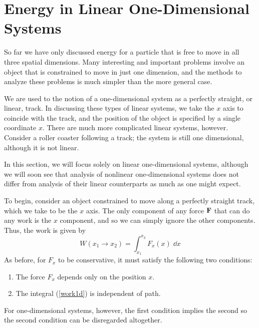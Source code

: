 \section{Energy in Linear One-Dimensional Systems}
So far we have only discussed energy for a particle that is free to move in all three spatial dimensions. Many interesting and important problems involve an object that is constrained to move in just one dimension, and the methods to analyze these problems is much simpler than the more general case. 

We are used to the notion of a one-dimensional system as a perfectly straight, or linear, track. In discussing these types of linear systems, we take the $x$ axis to coincide with the track, and the position of the object is specified by a single coordinate $x$. There are much more complicated linear systems, however. Consider a roller coaster following a track; the system is still one dimensional, although it is not linear.

In this section, we will focus solely on linear one-dimensional systems, although we will soon see that analysis of nonlinear one-dimensional systems does not differ from analysis of their linear counterparts as much as one might expect.

To begin, consider an object constrained to move along a perfectly straight track, which we take to be the $x$ axis. The only component of any force $\mathbf{F}$ that can do any work is the $x$ component, and so we can simply ignore the other components. Thus, the work is given by
\begin{equation} \label{work1d}
    W(x_1\to x_2) = \int_{x_1}^{x_2} F_x(x)\; \dd x
\end{equation}
As before, for $F_x$ to be conservative, it must satisfy the following two conditions:
\begin{enumerate}
    \item The force $F_x$ depends only on the position $x$.
    \item The integral (\ref{work1d}) is independent of path.
\end{enumerate}
For one-dimensional systems, however, the first condition implies the second so the second condition can be disregarded altogether.

